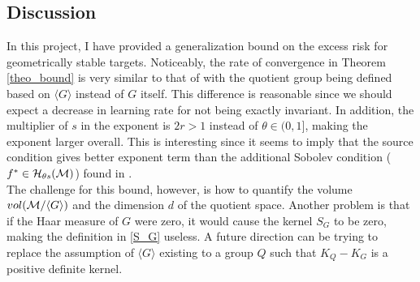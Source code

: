 \subsection{Discussion}
In this project, I have provided a generalization bound on the excess risk for geometrically stable targets. Noticeably, the rate of convergence in Theorem \ref{theo_bound} is very similar to that of \cite{tahmasebi2023exact} with the quotient group being defined based on $\langle G \rangle$ instead of $G$ itself. This difference is reasonable since we should expect a decrease in learning rate for not being exactly invariant. In addition, the multiplier of $s$ in the exponent is $2r>1$ instead of $\theta\in (0,1]$, making the exponent larger overall. This is interesting since it seems to imply that the source condition gives better exponent term than the additional Sobolev condition ($f^*\in \mathcal{H}_{\theta s}(\mathcal{M})$) found in \cite{tahmasebi2023exact}. \\
The challenge for this bound, however, is how to quantify the volume $vol(\mathcal{M}/\langle G\rangle)$ and the dimension $d$ of the quotient space. Another problem is that if the Haar measure of $G$ were zero, it would cause the kernel $S_G$ to be zero, making the definition in \eqref{S_G} useless. A future direction can be trying to replace the assumption of $\langle G\rangle$ existing to a group $Q$ such that $K_Q-K_G$ is a positive definite kernel. 